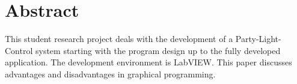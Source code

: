 \thispagestyle{empty}
\label{chap:Abstract}
\section*{Abstract}

This student research project deals with the development of a Party-Light-Control system starting with the program design up to the fully developed application. 
The development environment is LabVIEW. This paper discusses advantages and disadvantages in graphical programming.


